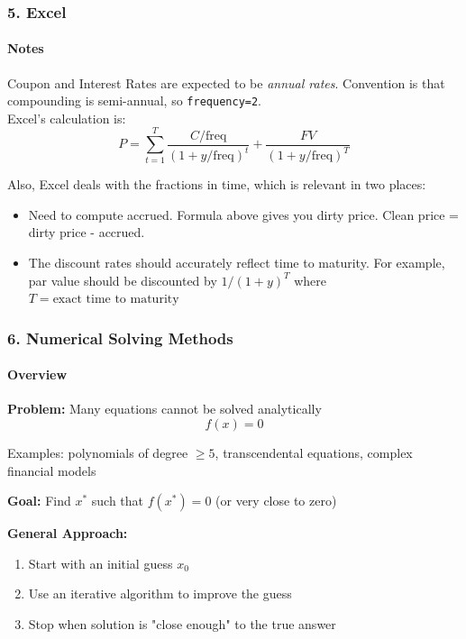 \documentclass{beamer}
\begin{document}
\begin{excelframe}[t]
    \frametitle{5. Excel}
    \framesubtitle{Notes}

    Coupon and Interest Rates are expected to be \textit{annual rates}.  Convention is that compounding is semi-annual, so \texttt{frequency=2}.\\
    \vspace{1em}
    Excel's calculation is:
    $$P = \sum_{t=1}^{T} \frac{C/\text{freq}}{(1 + y/\text{freq})^t} + \frac{FV}{(1 + y/\text{freq})^T}$$

    Also, Excel deals with the fractions in time, which is relevant in two places:

    \begin{itemize}
        \item Need to compute accrued.  Formula above gives you dirty price.  Clean price = dirty price - accrued.   
        \item The discount rates should accurately reflect time to maturity.   For example, par value should be discounted by $1/(1+y)^T$ where $T = \text{exact time to maturity}$
    \end{itemize}

\end{excelframe}

\begin{foundframe}[t]
    \frametitle{6. Numerical Solving Methods}
    \framesubtitle{Overview}

    \textbf{Problem:} Many equations cannot be solved analytically
    $$f(x) = 0$$
    
    Examples: polynomials of degree $\geq 5$, transcendental equations, complex financial models
    \vspace{1em}

    \textbf{Goal:} Find $x^*$ such that $f(x^*) = 0$ (or very close to zero)
    \vspace{1em}

    \textbf{General Approach:}
    \begin{enumerate}
        \item Start with an initial guess $x_0$
        \item Use an iterative algorithm to improve the guess
        \item Stop when solution is "close enough" to the true answer
    \end{enumerate}
    \vspace{1em}

\end{foundframe}
\end{document}
